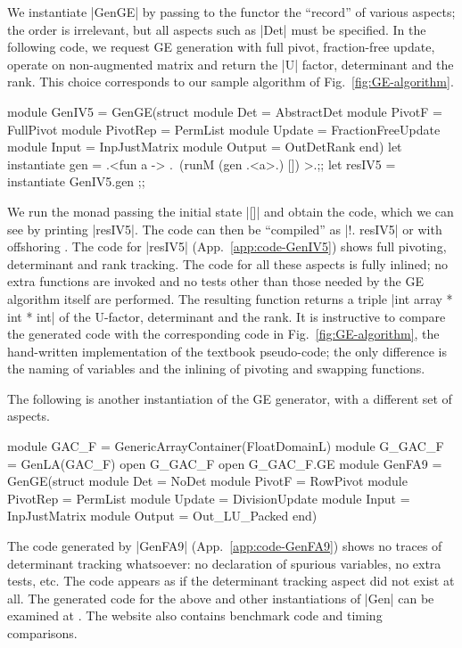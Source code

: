 \documentclass{elsart}
\begin{document}
We instantiate |GenGE| by passing to the functor the ``record'' of
various aspects; the order is irrelevant, but all aspects such as
|Det| must be specified. In the following code, we request GE generation
with full pivot, fraction-free update, operate on non-augmented matrix
and return the |U| factor, determinant and the rank. This choice
corresponds to our sample algorithm of Fig.~\ref{fig:GE-algorithm}.
\begin{code}
module GenIV5 = GenGE(struct 
    module Det = AbstractDet
    module PivotF = FullPivot
    module PivotRep = PermList
    module Update = FractionFreeUpdate
    module Input = InpJustMatrix
    module Output = OutDetRank end)
let instantiate gen =
    .<fun a -> .~(runM (gen .<a>.) []) >.;;
let resIV5 = instantiate GenIV5.gen ;;
\end{code}
We run the monad passing the initial state |[]| and obtain the code,
which we can see by printing |resIV5|. The code can then be
``compiled'' as |!. resIV5| or with offshoring \cite{offshoring}. The
code for |resIV5| (App.~\ref{app:code-GenIV5}) shows full pivoting,
determinant and rank tracking. The code for all these aspects is fully
inlined; no extra functions are invoked and no tests other than those
needed by the GE algorithm itself are performed. The resulting
function returns a triple |int array * int * int| of the U-factor,
determinant and the rank. It is instructive to compare the generated
code with the corresponding code in Fig.~\ref{fig:GE-algorithm}, the
hand-written implementation of the textbook pseudo-code; the only
difference is the naming of variables and the inlining of pivoting and
swapping functions.

The following is another instantiation of the GE generator, with a
different set of aspects.
\begin{code}
module GAC_F = GenericArrayContainer(FloatDomainL)
module G_GAC_F = GenLA(GAC_F)
open G_GAC_F
open G_GAC_F.GE
module GenFA9 = GenGE(struct 
    module Det = NoDet
    module PivotF = RowPivot
    module PivotRep = PermList
    module Update = DivisionUpdate
    module Input = InpJustMatrix
    module Output = Out_LU_Packed end)
\end{code}
The code generated by |GenFA9| (App.~\ref{app:code-GenFA9}) shows no traces of
determinant tracking whatsoever: no declaration of spurious variables,
no extra tests, etc. The code appears as if the determinant tracking
aspect did not exist at all. The generated code for the above and
other instantiations of |Gen| can be examined at
\cite{metamonadsURL}. The website also contains benchmark code and
timing comparisons.
\end{document}

